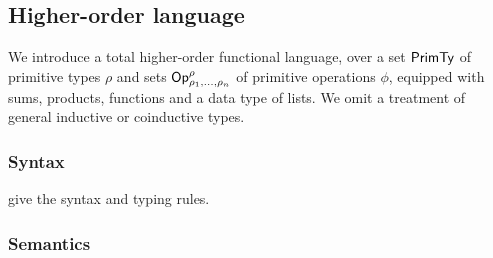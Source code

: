 \subsection{Higher-order language}

We introduce a total higher-order functional language, over a set $\mathsf{PrimTy}$ of primitive types $\rho$ and sets
$\mathsf{Op}^\rho_{\rho_1,\ldots,\rho_n}$ of primitive operations $\phi$, equipped with sums, products, functions
and a data type of lists. We omit a treatment of general inductive or coinductive types.

\subsubsection{Syntax}
\label{sec:language:syntax}


% 


 give the syntax and typing rules.

\subsubsection{Semantics}
\label{sec:language:semantics}

% 
% 
%
%



